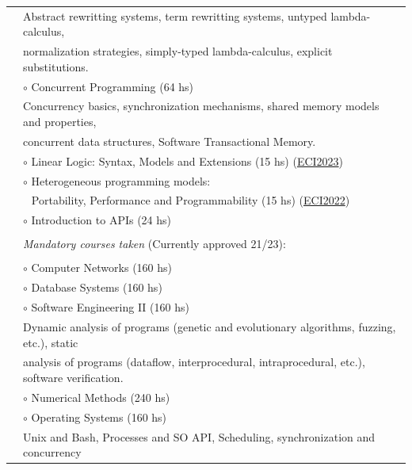 \documentclass{article}
\newcommand{\shade}[1]{\textcolor{myGray}{#1}}
\begin{document}
\begin{longtable}{l l}
                    & \indent \shade{Abstract rewritting systems, term rewritting systems, untyped lambda-calculus,} \\
                    & \indent \shade{normalization strategies, simply-typed lambda-calculus, explicit substitutions.} \\
                    & $\circ$ Concurrent Programming \shade{(64 hs)} \\
                    & \indent \shade{Concurrency basics, synchronization mechanisms, shared memory models and properties,}\\
                    & \indent \shade{concurrent data structures, Software Transactional Memory.} \\
                    & $\circ$ Linear Logic: Syntax, Models and Extensions \shade{(15 hs)} \hfill \shade{(\href{https://eci.dc.uba.ar/ecis-anteriores/eci2023/}{ECI2023})} \\
                    & $\circ$ Heterogeneous programming models: \\
                    & $~~$ Portability, Performance and Programmability \shade{(15 hs)} \hfill \shade{(\href{https://eci.dc.uba.ar/ecis-anteriores/eci2022/}{ECI2022})} \\
                    & $\circ$ Introduction to APIs \shade{(24 hs)} \\
                    \\
                    & \textit{Mandatory courses taken\footnotemark[1]} (Currently approved 21/23): \\
                    \\
                    & $\circ$ Computer Networks \shade{(160 hs)} \\
                    & $\circ$ Database Systems \shade{(160 hs)} \\
                    & $\circ$ Software Engineering II \shade{(160 hs)} \\
                    & \indent \shade{Dynamic analysis of programs (genetic and evolutionary algorithms, fuzzing, etc.), static} \\
                    & \indent \shade{analysis of programs (dataflow, interprocedural, intraprocedural, etc.), software verification.} \\
                    & $\circ$ Numerical Methods \shade{(240 hs)} \\
                    & $\circ$ Operating Systems \shade{(160 hs)} \\
                    & \indent \shade{Unix and Bash, Processes and SO API, Scheduling, synchronization and concurrency} \\

\end{longtable}
\end{document}
